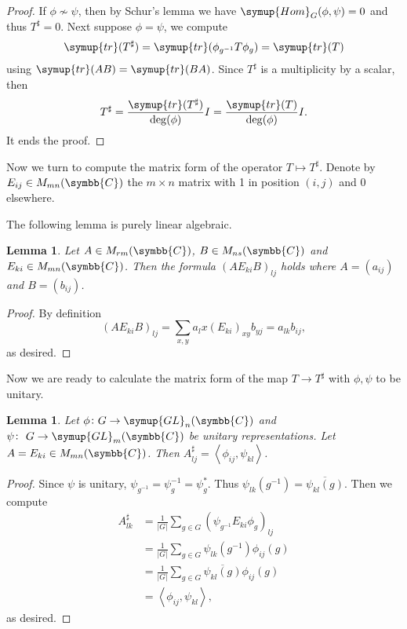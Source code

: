 \documentclass{assignment}[2019/10/15]
\newcommand{\lr}[3]{\left#1#3\right#2}
\theoremstyle{plain}
\newtheorem{lemma}[theorem]{Lemma}
\newcommand{\BC}{\symbb{C}}
\newcommand{\Hom}{\mathop{}\!\symup{Hom}}
\newcommand{\GL}{\mathop{}\!\symup{GL}}
\newcommand{\tr}{\mathop{}\!\symup{tr}}
\numberwithin{equation}{section}
\begin{document}
    \begin{proof}\label{lem: schur-var}
        If $\phi\nsim\psi$, then by Schur's lemma we have $\Hom_G(\phi, \psi)=0$ and thus $T^\sharp = 0$. Next suppose $\phi = \psi$, we compute
        \begin{equation}
            \tr(T^\sharp) = \tr(\phi_{g^{-1}}T\phi_g) = \tr(T)
        \end{equation}
        using $\tr(AB)=\tr(BA)$. Since $T^\sharp$ is a multiplicity by a scalar, then
        \begin{equation}
            T^\sharp = \frac{\tr(T^\sharp)}{\deg(\phi)}I = \frac{\tr(T)}{\deg(\phi)}I.
        \end{equation}
        It ends the proof.
    \end{proof}

    Now we turn to compute the matrix form of the operator $T\mapsto T^\sharp$. Denote by $E_{ij}\in M_{mn}(\BC)$ the $m\times n$ matrix with 1 in position $(i, j)$ and 0 elsewhere.

    The following lemma is purely linear algebraic.

    \begin{lemma}
        Let $A\in M_{rm}(\BC)$, $B\in M_{ns}(\BC)$ and $E_{ki}\in M_{mn}(\BC)$. Then the formula $(AE_{ki}B)_{lj}$ holds where $A = (a_{ij})$ and $B=(b_{ij})$.
    \end{lemma}

    \begin{proof}
        By definition
        \begin{equation}
            (AE_{ki}B)_{lj} = \sum_{x, y}a_lx(E_{ki})_{xy}b_{yj} = a_{lk}b_{ij},
        \end{equation}
        as desired.
    \end{proof}

    Now we are ready to calculate the matrix form of the map $T\to T^\sharp$ with $\phi, \psi$ to be unitary.

    \begin{lemma}
        Let $\phi\colon G\to \GL_n(\BC)$ and $\psi\colon\ G\to\GL_m(\BC)$ be unitary representations. Let $A = E_{ki}\in M_{mn}(\BC)$. Then $A_{lj}^\sharp = \lr<>{\phi_{ij}, \psi_{kl}}$.
    \end{lemma}

    \begin{proof}
        Since $\psi$ is unitary, $\psi_{g^{-1}} = \psi_g^{-1} = \psi_{g}^*$. Thus $\psi_{lk}(g^{-1}) = \overline{\psi_{kl}(g)}$. Then we compute
        \begin{equation}
            \begin{aligned}
                A_{lk}^\sharp &= \frac{1}{|G|}\sum_{g\in G}(\psi_{g^{-1}}E_{ki}\phi_g)_{lj}\\
                &= \frac{1}{|G|}\sum_{g\in G}\psi_{lk}(g^{-1})\phi_{ij}(g)\\
                &= \frac{1}{|G|}\sum_{g\in G}\overline{\psi_{kl}(g)}\phi_{ij}(g)\\
                &= \lr<>{\phi_{ij}, \psi_{kl}},
            \end{aligned}
        \end{equation}
        as desired.
    \end{proof}
\end{document}
